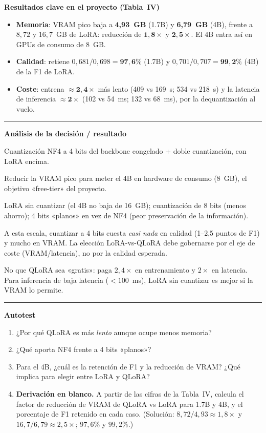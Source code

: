 \documentclass[11pt,a4paper]{article}
\newcommand{\nivel}[1]{\medskip\noindent\textbf{\textcolor{blue!45!black}{#1}}\par\nopagebreak\smallskip}
\newenvironment{analisis}{%
  \medskip\par\noindent\rule{\linewidth}{0.4pt}\par\nopagebreak
  \textbf{Análisis de la decisión / resultado}\par\nopagebreak\smallskip
  \begin{description}[leftmargin=2.6cm,style=nextline,font=\bfseries]
}{%
  \end{description}\noindent\rule{\linewidth}{0.4pt}\par\medskip
}
\begin{document}
\nivel{Resultados clave en el proyecto (Tabla~IV)}
\begin{itemize}[nosep]
  \item \textbf{Memoria}: VRAM pico baja a \textbf{4,93~GB} (1.7B) y \textbf{6,79~GB} (4B), frente a
        $8{,}72$ y $16{,}7$~GB de LoRA: reducción de $\mathbf{1{,}8\times}$ y $\mathbf{2{,}5\times}$.
        El 4B entra así en GPUs de consumo de 8~GB.
  \item \textbf{Calidad}: retiene $0{,}681/0{,}698 = \mathbf{97{,}6\%}$ (1.7B) y
        $0{,}701/0{,}707 = \mathbf{99{,}2\%}$ (4B) de la F1 de LoRA.
  \item \textbf{Coste}: entrena $\approx\mathbf{2{,}4\times}$ más lento (409 vs 169~s; 534 vs 218~s)
        y la latencia de inferencia $\approx\mathbf{2\times}$ (102 vs 54~ms; 132 vs 68~ms), por la
        dequantización al vuelo.
\end{itemize}

\begin{analisis}
  \item[Qué] Cuantización NF4 a 4 bits del backbone congelado + doble cuantización, con LoRA encima.
  \item[Por qué] Reducir la VRAM pico para meter el 4B en hardware de consumo (8~GB), el objetivo
        «free-tier» del proyecto.
  \item[Alternativas descartadas] LoRA sin cuantizar (el 4B no baja de 16~GB); cuantización de 8
        bits (menos ahorro); 4 bits «planos» en vez de NF4 (peor preservación de la información).
  \item[Qué significa] A esta escala, cuantizar a 4 bits cuesta \emph{casi nada} en calidad
        (1--2,5 puntos de F1) y mucho en VRAM. La elección LoRA-vs-QLoRA debe gobernarse por el eje
        de coste (VRAM/latencia), no por la calidad esperada.
  \item[Qué NO significa] No que QLoRA sea «gratis»: paga $2{,}4\times$ en entrenamiento y $2\times$
        en latencia. Para inferencia de baja latencia ($<100$~ms), LoRA sin cuantizar es mejor si la
        VRAM lo permite.
\end{analisis}

\nivel{Autotest}
\begin{enumerate}[nosep]
  \item ¿Por qué QLoRA es más \emph{lento} aunque ocupe menos memoria?
  \item ¿Qué aporta NF4 frente a 4 bits «planos»?
  \item Para el 4B, ¿cuál es la retención de F1 y la reducción de VRAM? ¿Qué implica para elegir
        entre LoRA y QLoRA?
  \item \textbf{Derivación en blanco.} A partir de las cifras de la Tabla~IV, calcula el factor de
        reducción de VRAM de QLoRA vs LoRA para 1.7B y 4B, y el porcentaje de F1 retenido en cada
        caso. (Solución: $8{,}72/4{,}93\approx1{,}8\times$ y $16{,}7/6{,}79\approx2{,}5\times$;
        $97{,}6\%$ y $99{,}2\%$.)
\end{enumerate}
\end{document}

